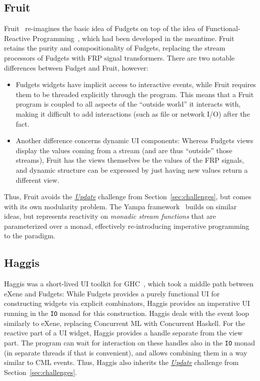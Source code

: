 \documentclass[sigplan,screen]{acmart}
\begin{document}
\subsection{Fruit}

Fruit~\cite{Fruit} re-imagines the basic idea of Fudgets on top of the
idea of Functional-Reactive Programming~\cite{FRP}, which had been
developed in the meantime.  Fruit retains the purity and
compositionality of Fudgets,  replacing the stream processors of
Fudgets with FRP signal transformers.  There are two notable
differences between Fudget and Fruit, however:
\begin{itemize}
\item Fudgets widgets have implicit access to interactive events,
  while Fruit requires them to be threaded explicitly through the
  program.  This means that a Fruit program is coupled to all aspects
  of the ``outside world'' it interacts with, making it difficult to
  add interactions (such as file or network I/O) after
  the fact.
\item Another difference concerns dynamic UI components:
  Whereas Fudgets views display the values coming from a
  stream (and are thus ``outside'' those streams), Fruit has the views
  themselves be the values of the FRP signals, and dynamic structure
  can be expressed by just having new values return a different view.
\end{itemize}
%
Thus, Fruit avoids the \hyperlink{challenge:update}{\textit{Update}} challenge from Section~\ref{sec:challenges},
but comes with its own modularity problem.  The Yampa framework~\cite{Yampa} builds
on similar ideas, but represents reactivity on \textit{monadic stream
  functions} that are parameterized over a monad, effectively re-introducing
imperative programming to the paradigm.

\subsection{Haggis}

Haggis was a short-lived UI toolkit for GHC~\cite{Haggis}, which took
a middle path between eXene and Fudgets: While Fudgets
provides a purely functional UI for constructing widgets via explicit
combinators, Haggis provides an imperative UI running in the
\texttt{IO} monad for this construction.  Haggis deals with the event
loop similarly to eXene, replacing Concurrent ML with Concurrent
Haskell.  For the reactive part of a UI widget, Haggis provides a
handle separate from the view part.  The program can wait for
interaction on these handles also in the \texttt{IO} monad (in
separate threads if that is convenient), and allows combining them in
a way similar to CML events.  Thus, Haggis also inherits the
\hyperlink{challenge:update}{\textit{Update}} challenge from Section~\ref{sec:challenges}.
\end{document}
